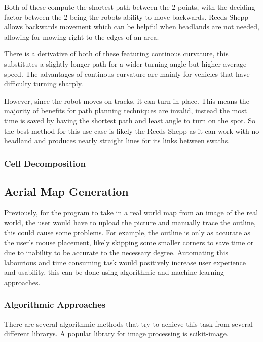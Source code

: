 \documentclass[final]{cmpreport_02}
\begin{document}
Both of these compute the shortest path between the 2 points, with the deciding factor between the 2 being the robots ability to move backwards.
Reeds-Shepp allows backwards movement which can be helpful when headlands are not needed, allowing for mowing right to the edges of an area.

There is a derivative of both of these featuring continous curvature, this substitutes a slightly longer path for a wider turning angle but higher average speed. 
The advantages of continous curvature are mainly for vehicles that have difficulty turning sharply.

However, since the robot moves on tracks, it can turn in place.
This means the majority of benefits for path planning techniques are invalid, instead the most time is saved by having the shortest path and least angle to turn on the spot.
So the best method for this use case is likely the Reeds-Shepp as it can work with no headland and produces nearly straight lines for its links between swaths.


\subsubsection{Cell Decomposition}






\subsection{Aerial Map Generation}
Previously, for the program to take in a real world map from an image of the real world, the user would have to upload the picture and manually trace the outline, this could cause some problems.
For example, the outline is only as accurate as the user's mouse placement, likely skipping some smaller corners to save time or due to inability to be accurate to the necessary degree.
Automating this labourious and time consuming task would positively increase user experience and usability, this can be done using algorithmic and machine learning approaches.

\subsubsection{Algorithmic Approaches}
There are several algorithmic methods that try to achieve this task from several different librarys. A popular library for image processing is scikit-image.
\end{document}
